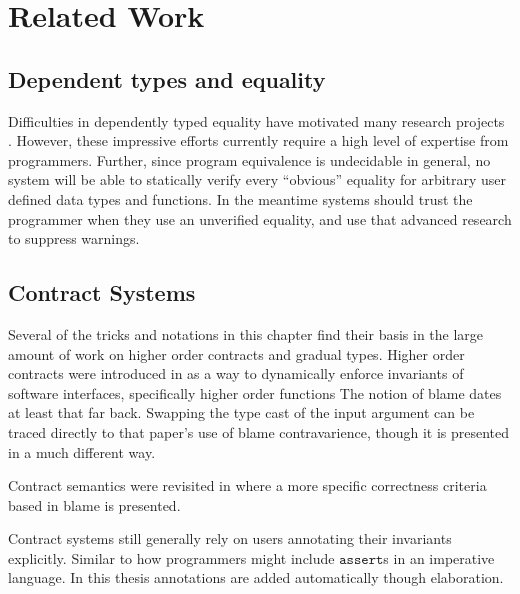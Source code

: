 
\section{Related Work}

\subsection{Dependent types and equality}


Difficulties in dependently typed equality have motivated many research
projects \cite{HoTTbook,sjoberg2015programming,cockx2021taming}.
However, these impressive efforts currently require a high level of
expertise from programmers. Further, since program equivalence is
undecidable in general, no system will be able to statically verify
every ``obvious'' equality for arbitrary user defined data types
and functions. In the meantime systems should trust the programmer
when they use an unverified equality, and use that advanced research
to suppress warnings. 

\subsection{Contract Systems}

Several of the tricks and notations in this chapter find their basis
in the large amount of work on higher order contracts and gradual
types. Higher order contracts were introduced in \cite{10.1145/581478.581484}
as a way to dynamically enforce invariants of software interfaces,
specifically higher order functions%
The notion of blame dates at least that far back. Swapping the type
cast of the input argument can be traced directly to that paper's
use of blame contravarience, though it is presented in a much different
way. %

Contract semantics were revisited in \cite{10.1145/1925844.1926410,10.1007/978-3-642-28869-2_11}
where a more specific correctness criteria based in blame is presented.

Contract systems still generally rely on users annotating their invariants
explicitly. Similar to how programmers might include $\mathtt{assert}$s
in an imperative language. In this thesis annotations are added automatically
though elaboration.

